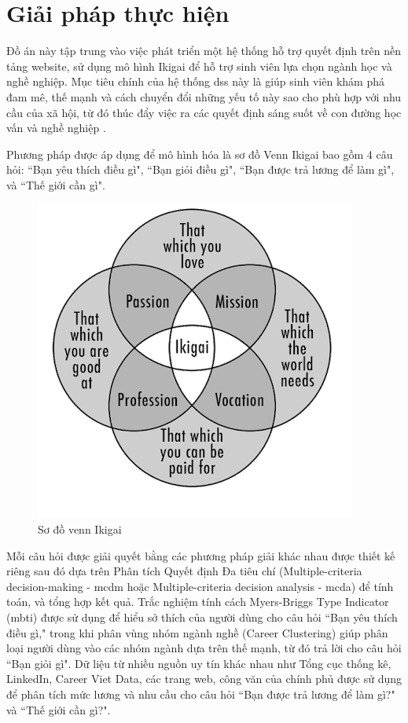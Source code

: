 \section{Giải pháp thực hiện}    
    Đồ án này tập trung vào việc phát triển một hệ thống hỗ trợ quyết định trên nền tảng website, sử dụng mô hình Ikigai để hỗ trợ sinh viên lựa chọn ngành học và nghề nghiệp. Mục tiêu chính của hệ thống \acrshort{dss} này là giúp sinh viên khám phá đam mê, thế mạnh và cách chuyển đổi những yếu tố này sao cho phù hợp với nhu cầu của xã hội, từ đó thúc đẩy việc ra các quyết định sáng suốt về con đường học vấn và nghề nghiệp .

    Phương pháp được áp dụng để mô hình hóa là sơ đồ Venn Ikigai bao gồm 4 câu hỏi: ``Bạn yêu thích điều gì", ``Bạn giỏi điều gì", ``Bạn được trả lương để làm gì", và ``Thế giới cần gì". 
    \begin{figure}[H]
        \centering
        \includegraphics[width=0.5\linewidth]{images/ikigai.png}
        \vspace{0.6cm}
        \caption{Sơ đồ venn Ikigai}
    \end{figure}

    Mỗi câu hỏi được giải quyết bằng các phương pháp giải khác nhau được thiết kế riêng sau đó dựa trên Phân tích Quyết định Đa tiêu chí (Multiple-criteria decision-making - \acrshort{mcdm} hoặc Multiple-criteria decision analysis - \acrshort{mcda}) để tính toán, và tổng hợp kết quả. Trắc nghiệm tính cách Myers-Briggs Type Indicator (\acrshort{mbti}) được sử dụng để hiểu sở thích của người dùng cho câu hỏi ``Bạn yêu thích điều gì," trong khi phân vùng nhóm ngành nghề (Career Clustering) giúp phân loại người dùng vào các nhóm ngành dựa trên thế mạnh, từ đó trả lời cho câu hỏi ``Bạn giỏi gì". Dữ liệu từ nhiều nguồn uy tín khác nhau như Tổng cục thống kê, LinkedIn, Career Viet Data, các trang web, công văn của chính phủ được sử dụng để phân tích mức lương và nhu cầu cho câu hỏi ``Bạn được trả lương để làm gì?" và ``Thế giới cần gì?".
    

